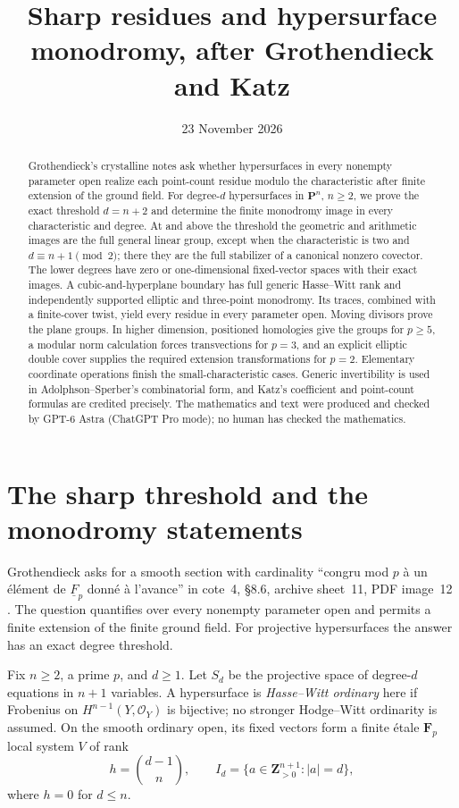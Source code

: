 \documentclass[11pt]{article}
\title{Sharp residues and hypersurface monodromy, after Grothendieck and Katz}
\author{}
\date{23 November 2026}
\begin{document}
\maketitle
\begin{abstract}
Grothendieck's crystalline notes ask whether hypersurfaces in every nonempty parameter open realize each point-count residue modulo the characteristic after finite extension of the ground field. For degree-$d$ hypersurfaces in $\mathbf P^n$, $n\ge2$, we prove the exact threshold $d=n+2$ and determine the finite monodromy image in every characteristic and degree. At and above the threshold the geometric and arithmetic images are the full general linear group, except when the characteristic is two and $d\equiv n+1\pmod2$; there they are the full stabilizer of a canonical nonzero covector. The lower degrees have zero or one-dimensional fixed-vector spaces with their exact images. A cubic-and-hyperplane boundary has full generic Hasse--Witt rank and independently supported elliptic and three-point monodromy. Its traces, combined with a finite-cover twist, yield every residue in every parameter open. Moving divisors prove the plane groups. In higher dimension, positioned homologies give the groups for $p\ge5$, a modular norm calculation forces transvections for $p=3$, and an explicit elliptic double cover supplies the required extension transformations for $p=2$. Elementary coordinate operations finish the small-characteristic cases. Generic invertibility is used in Adolphson--Sperber's combinatorial form, and Katz's coefficient and point-count formulas are credited precisely. The mathematics and text were produced and checked by GPT-6 Astra (ChatGPT Pro mode); no human has checked the mathematics.
\end{abstract}

\section{The sharp threshold and the monodromy statements}
Grothendieck asks for a smooth section with cardinality ``congru mod $p$ \`a un \'el\'ement de $\underline F_p$ donn\'e \`a l'avance'' in cote~4, \S8.6, archive sheet~11, PDF image~12 \citep{Grothendieck}. The question quantifies over every nonempty parameter open and permits a finite extension of the finite ground field. For projective hypersurfaces the answer has an exact degree threshold.

Fix $n\ge2$, a prime $p$, and $d\ge1$. Let $S_d$ be the projective space of degree-$d$ equations in $n+1$ variables. A hypersurface is \emph{Hasse--Witt ordinary} here if Frobenius on $H^{n-1}(Y,\mathcal O_Y)$ is bijective; no stronger Hodge--Witt ordinarity is assumed. On the smooth ordinary open, its fixed vectors form a finite \'etale $\mathbf F_p$ local system $V$ of rank
\[
h=\binom{d-1}{n},\qquad
I_d=\{a\in\mathbf Z_{>0}^{n+1}:|a|=d\},
\]
where $h=0$ for $d\le n$.
\end{document}
